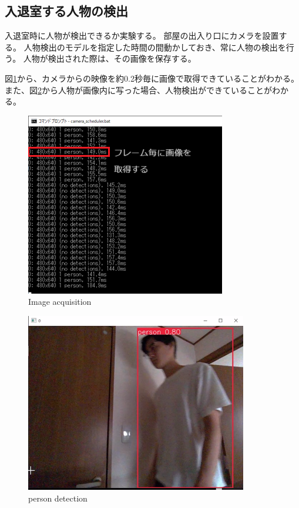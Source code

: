 \documentclass[10pt]{jarticle}
\begin{document}
    \subsection{入退室する人物の検出}
        \label{experiment1}

入退室時に人物が検出できるか実験する。
部屋の出入り口にカメラを設置する。
人物検出のモデルを指定した時間の間動かしておき、常に人物の検出を行う。
人物が検出された際は、その画像を保存する。

図\ref{Image acquisition}から、カメラからの映像を約0.2秒毎に画像で取得できていることがわかる。
また、図\ref{person detection}から人物が画像内に写った場合、人物検出ができていることがわかる。

\begin{figure}[!h]
    \centering
    \includegraphics[width=0.8\linewidth]{fig/frame2.png}
    \caption{Image acquisition}
    \label{Image acquisition}
    \end{figure}

\begin{figure}[!h]
    \centering
    \includegraphics[width=0.8\linewidth]{fig/boundingbox.png}
    \caption{person detection}
    \label{person detection}
    \end{figure}
\end{document}
